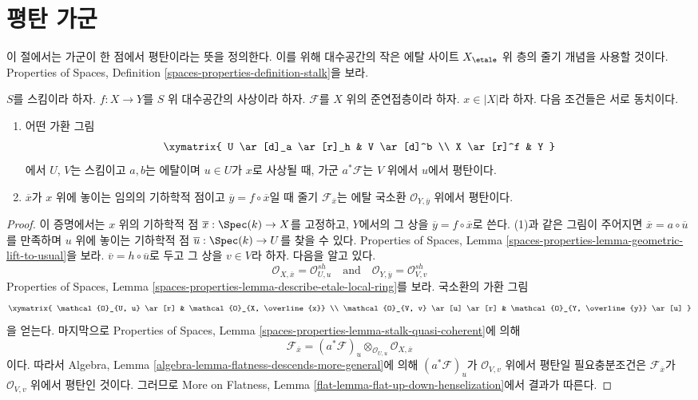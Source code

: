 \section{평탄 가군}
\label{section-flat-modules}

\noindent
이 절에서는 가군이 한 점에서 평탄이라는 뜻을 정의한다.
이를 위해 대수공간의 작은 에탈 사이트 $X_\etale$ 위 층의
줄기 개념을 사용할 것이다. Properties of Spaces, Definition
\ref{spaces-properties-definition-stalk}을 보라.

\begin{lemma}
\label{lemma-flat-at-point}
$S$를 스킴이라 하자. $f : X \to Y$를 $S$ 위 대수공간의 사상이라 하자.
$\mathcal{F}$를 $X$ 위의 준연접층이라 하자.
$x \in |X|$라 하자. 다음 조건들은 서로 동치이다.
\begin{enumerate}
\item 어떤 가환 그림
$$
\xymatrix{
U \ar[d]_a \ar[r]_h & V \ar[d]^b \\
X \ar[r]^f & Y
}
$$
에서 $U$, $V$는 스킴이고 $a, b$는 에탈이며 $u \in U$가
$x$로 사상될 때, 가군 $a^*\mathcal{F}$는 $V$ 위에서
$u$에서 평탄이다.
\item $\overline{x}$가 $x$ 위에 놓이는 임의의 기하학적 점이고
$\overline{y} = f \circ \overline{x}$일 때 줄기
$\mathcal{F}_{\overline{x}}$는 에탈 국소환
$\mathcal{O}_{Y, \overline{y}}$ 위에서 평탄이다.
\end{enumerate}
\end{lemma}

\begin{proof}
이 증명에서는 $x$ 위의 기하학적 점
$\overline{x} : \Spec(k) \to X$를 고정하고,
$Y$에서의 그 상을 $\overline{y} = f \circ \overline{x}$로 쓴다.
(1)과 같은 그림이 주어지면 $\overline{x} = a \circ \overline{u}$를
만족하며 $u$ 위에 놓이는 기하학적 점
$\overline{u} : \Spec(k) \to U$를 찾을 수 있다.
Properties of Spaces, Lemma
\ref{spaces-properties-lemma-geometric-lift-to-usual}을 보라.
$\overline{v} = h \circ \overline{u}$로 두고 그 상을 $v \in V$라 하자.
다음을 알고 있다.
$$
\mathcal{O}_{X, \overline{x}} = \mathcal{O}_{U, u}^{sh}
\quad\text{and}\quad
\mathcal{O}_{Y, \overline{y}} = \mathcal{O}_{V, v}^{sh}
$$
Properties of Spaces, Lemma
\ref{spaces-properties-lemma-describe-etale-local-ring}를 보라.
국소환의 가환 그림
$$
\xymatrix{
\mathcal{O}_{U, u} \ar[r] &
\mathcal{O}_{X, \overline{x}} \\
\mathcal{O}_{V, v} \ar[u] \ar[r] &
\mathcal{O}_{Y, \overline{y}} \ar[u]
}
$$
을 얻는다. 마지막으로 Properties of Spaces, Lemma
\ref{spaces-properties-lemma-stalk-quasi-coherent}에 의해
$$
\mathcal{F}_{\overline{x}} =
(a^*\mathcal{F})_u \otimes_{\mathcal{O}_{U, u}}
\mathcal{O}_{X, \overline{x}}
$$
이다. 따라서 Algebra, Lemma
\ref{algebra-lemma-flatness-descends-more-general}에 의해
$(a^*\mathcal{F})_u$가 $\mathcal{O}_{V, v}$ 위에서 평탄일
필요충분조건은 $\mathcal{F}_{\overline{x}}$가
$\mathcal{O}_{V, v}$ 위에서 평탄인 것이다.
그러므로 More on Flatness, Lemma
\ref{flat-lemma-flat-up-down-henselization}에서 결과가 따른다.
\end{proof}

